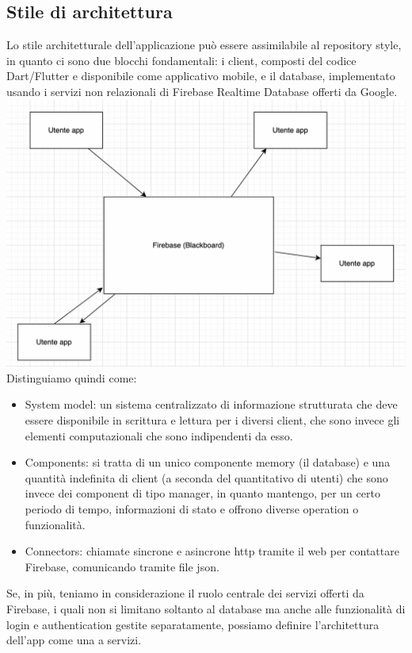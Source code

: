 \documentclass{article}
\begin{document}
\subsection{Stile di architettura}
Lo stile architetturale dell’applicazione può essere assimilabile al repository style, in quanto ci sono due blocchi fondamentali: i client, composti del codice Dart/Flutter e disponibile come applicativo mobile, e il database, implementato usando i servizi non relazionali di Firebase Realtime Database offerti da Google. 
\\\includegraphics[scale = 0.45]{"Immagini/Blackboard.PNG"} 
\\Distinguiamo quindi come:
\begin{itemize}
\item System model: un sistema centralizzato di informazione strutturata che deve essere disponibile in scrittura e lettura per i diversi client, che sono invece gli elementi computazionali che sono indipendenti da esso.  
\item Components: si tratta di un unico componente memory (il database) e una quantità indefinita di client (a seconda del quantitativo di utenti) che sono invece dei component di tipo manager, in quanto mantengo, per un certo periodo di tempo, informazioni di stato e offrono diverse operation o funzionalità.
\item Connectors: chiamate sincrone e asincrone http tramite il web per contattare Firebase, comunicando tramite file json.  
\end{itemize}
Se, in più, teniamo in considerazione il ruolo centrale dei servizi offerti da Firebase, i quali non si limitano soltanto al database ma anche alle funzionalità di login e authentication gestite separatamente, possiamo definire l’architettura dell’app come una a servizi.
\end{document}
